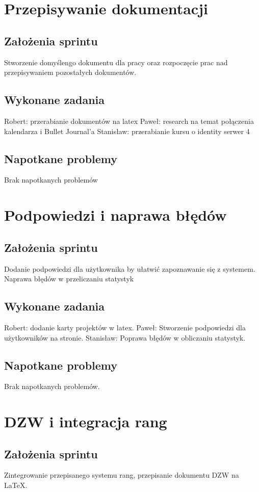 \documentclass[a4paper,11pt]{report}
\begin{document}
\section {Przepisywanie dokumentacji}
\subsection {Założenia sprintu}
Stworzenie domyślengo dokumentu dla pracy oraz rozpoczęcie prac nad przepisywaniem pozostałych dokumentów.
\subsection {Wykonane zadania}
Robert: przerabianie dokumentów na latex 
Paweł: research na temat połączenia kalendarza i Bullet Journal'a  
Stanisław: przerabianie kursu o identity serwer 4 
\subsection {Napotkane problemy}
Brak napotkanych problemów




\section {Podpowiedzi i naprawa błędów}
\subsection {Założenia sprintu}
Dodanie podpowiedzi dla użytkownika by ułatwić zapoznawanie się z systemem. Naprawa błędów w przeliczaniu statystyk
\subsection {Wykonane zadania}
Robert: dodanie karty projektów w latex.
Paweł: Stworzenie podpowiedzi dla użytkowników na stronie. 
Stanisław: Poprawa błędów w obliczaniu statystyk.  
\subsection {Napotkane problemy}
Brak napotkanych problemów.

\section {DZW i integracja rang}
\subsection {Założenia sprintu}
Zintegrowanie przepisanego systemu rang, przepisanie dokumentu DZW na LaTeX.
\end{document}
